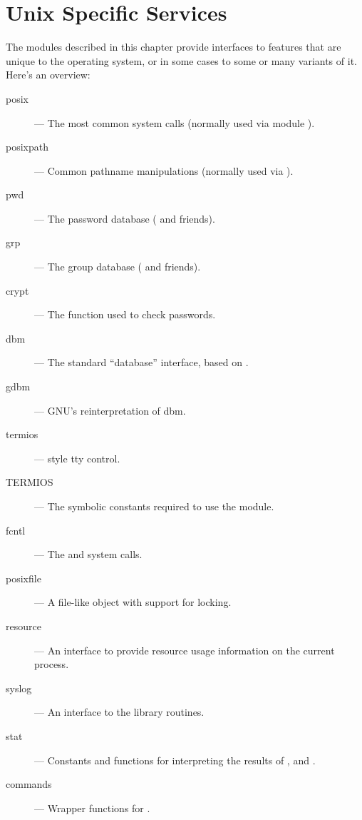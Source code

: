 \chapter{Unix Specific Services}

The modules described in this chapter provide interfaces to features
that are unique to the \UNIX{} operating system, or in some cases to
some or many variants of it.  Here's an overview:

\begin{description}

\item[posix]
--- The most common \POSIX{} system calls (normally used via module ).

\item[posixpath]
--- Common \POSIX{} pathname manipulations (normally used via ).

\item[pwd]
--- The password database ( and friends).

\item[grp]
--- The group database ( and friends).

\item[crypt]
--- The  function used to check \UNIX{} passwords.

\item[dbm]
--- The standard ``database'' interface, based on .

\item[gdbm]
--- GNU's reinterpretation of dbm.

\item[termios]
--- \POSIX{} style tty control.

\item[TERMIOS]
--- The symbolic constants required to use the  module.

\item[fcntl]
--- The  and  system calls.

\item[posixfile]
--- A file-like object with support for locking.

\item[resource]
--- An interface to provide resource usage information on the current
process.

\item[syslog]
--- An interface to the \UNIX{}  library routines.

\item[stat]
--- Constants and functions for interpreting the results of
,  and .

\item[commands]
--- Wrapper functions for .

\end{description}
